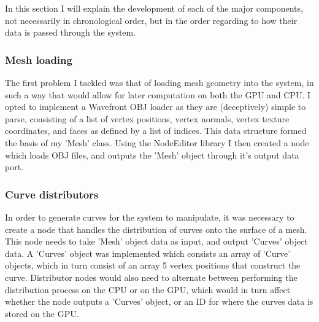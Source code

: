 \documentclass[]{acmsiggraph}
\begin{document}
In this section I will explain the development of each of the major components, not necessarily in chronological order, but in the order regarding to how their data is passed through the system.



\subsubsection{Mesh loading} \label{sec:objLoading}

The first problem I tackled was that of loading mesh geometry into the system, in such a way that would allow for later computation on both the GPU and CPU. I opted to implement a Wavefront OBJ loader as they are (deceptively) simple to parse, consisting of a list of vertex positions, vertex normals, vertex texture coordinates, and faces as defined by a list of indices. This data structure formed the basis of my 'Mesh' class. Using the NodeEditor library I then created a node which loads OBJ files, and outputs the 'Mesh' object through it's output data port.

\subsubsection{Curve distributors} \label{sec:distributors}

In order to generate curves for the system to manipulate, it was necessary to create a node that handles the distribution of curves onto the surface of a mesh. This node needs to take 'Mesh' object data as input, and output 'Curves' object data. A 'Curves' object was implemented which consists an array of 'Curve' objects, which in turn consist of an array 5 vertex positions that construct the curve. Distributor nodes would also need to alternate between performing the distribution process on the CPU or on the GPU, which would in turn affect whether the node outputs a 'Curves' object, or an ID for where the curves data is stored on the GPU.
\end{document}
